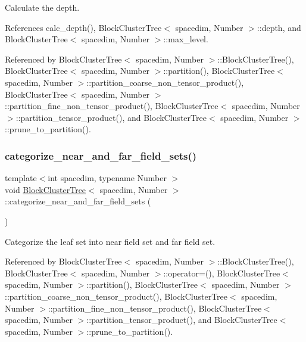 Calculate the depth. 

References calc\+\_\+depth(), Block\+Cluster\+Tree$<$ spacedim, Number $>$\+::depth, and Block\+Cluster\+Tree$<$ spacedim, Number $>$\+::max\+\_\+level.



Referenced by Block\+Cluster\+Tree$<$ spacedim, Number $>$\+::\+Block\+Cluster\+Tree(), Block\+Cluster\+Tree$<$ spacedim, Number $>$\+::partition(), Block\+Cluster\+Tree$<$ spacedim, Number $>$\+::partition\+\_\+coarse\+\_\+non\+\_\+tensor\+\_\+product(), Block\+Cluster\+Tree$<$ spacedim, Number $>$\+::partition\+\_\+fine\+\_\+non\+\_\+tensor\+\_\+product(), Block\+Cluster\+Tree$<$ spacedim, Number $>$\+::partition\+\_\+tensor\+\_\+product(), and Block\+Cluster\+Tree$<$ spacedim, Number $>$\+::prune\+\_\+to\+\_\+partition().

\mbox{\label{classBlockClusterTree_a286bd48cc863cbba7c9ad53b6bdb12ca}} 
\subsubsection{\texorpdfstring{categorize\+\_\+near\+\_\+and\+\_\+far\+\_\+field\+\_\+sets()}{categorize\_near\_and\_far\_field\_sets()}}
{\footnotesize\ttfamily template$<$int spacedim, typename Number $>$ \\
void \hyperlink{classBlockClusterTree}{Block\+Cluster\+Tree}$<$ spacedim, Number $>$\+::categorize\+\_\+near\+\_\+and\+\_\+far\+\_\+field\+\_\+sets (\begin{DoxyParamCaption}{ }\end{DoxyParamCaption})}

Categorize the leaf set into near field set and far field set. 

Referenced by Block\+Cluster\+Tree$<$ spacedim, Number $>$\+::\+Block\+Cluster\+Tree(), Block\+Cluster\+Tree$<$ spacedim, Number $>$\+::operator=(), Block\+Cluster\+Tree$<$ spacedim, Number $>$\+::partition(), Block\+Cluster\+Tree$<$ spacedim, Number $>$\+::partition\+\_\+coarse\+\_\+non\+\_\+tensor\+\_\+product(), Block\+Cluster\+Tree$<$ spacedim, Number $>$\+::partition\+\_\+fine\+\_\+non\+\_\+tensor\+\_\+product(), Block\+Cluster\+Tree$<$ spacedim, Number $>$\+::partition\+\_\+tensor\+\_\+product(), and Block\+Cluster\+Tree$<$ spacedim, Number $>$\+::prune\+\_\+to\+\_\+partition().


